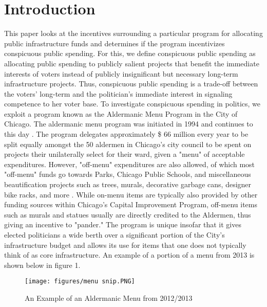 \section*{Introduction}
This paper looks at the incentives surrounding a particular program for allocating public infrastructure funds and determines if the program incentivizes conspicuous public spending.
For this, we define conspicuous public spending as allocating public spending to publicly salient projects that benefit the immediate interests of voters instead of publicly insignificant but necessary long-term infrastructure projects. 
Thus, conspicuous public spending is a trade-off between the voters' long-term and the politician's immediate interest in signaling competence to her voter base. 
To investigate conspicuous spending in politics, we exploit a program known as the Aldermanic Menu Program in the City of Chicago. 
The aldermanic menu program was initiated in 1994 and continues to this day \cite{OIGaudit}. 
The program delegates approximately \$ 66 million every year to be split equally amongst the 50 aldermen in Chicago's city council to be spent on projects their unilaterally select for their ward, given a "menu" of acceptable expenditures. 
However, "off-menu" expenditures are also allowed, of which most "off-menu" funds go towards Parks, Chicago Public Schools, and miscellaneous beautification projects such as trees, murals, decorative garbage cans, designer bike racks, and more \cite{OIGaudit}. 
While on-menu items are typically also provided by other funding sources within Chicago's Capital Improvement Program, off-menu items such as murals and statues usually are directly credited to the Aldermen, thus giving an incentive to "pander."  
The program is unique insofar that it gives elected politicians a wide berth over a significant portion of the City's infrastructure budget and allows its use for items that one does not typically think of as core infrastructure. 
An example of a portion of a menu from 2013 is shown below in figure 1.


\begin{figure}[H]
    \centering
    \caption{An Example of an Aldermanic Menu from 2012/2013}
    \texttt{[image: figures/menu snip.PNG]}
\end{figure}

